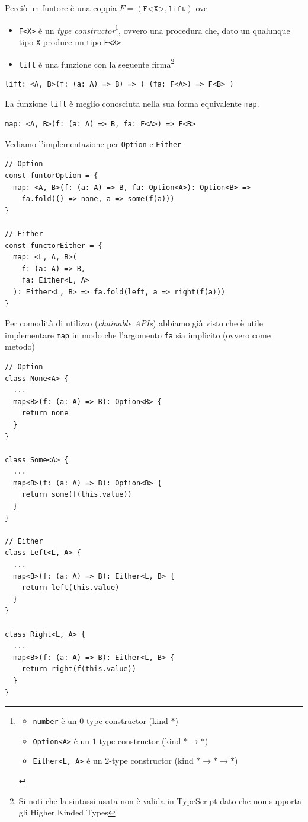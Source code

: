 \documentclass[12pt]{article}
\begin{document}
Perciò un funtore è una coppia $F = (\texttt{F<X>}, \texttt{lift})$ ove

\begin{itemize}
  \item \texttt{F<X>} è un \emph{type constructor}\footnote{
    \begin{itemize}
      \item \texttt{number} è un $0$-type constructor (kind $*$)
      \item \texttt{Option<A>} è un $1$-type constructor (kind $* \rightarrow *$)
      \item \texttt{Either<L, A>} è un $2$-type constructor (kind $* \rightarrow * \rightarrow *$)
    \end{itemize}
  }, ovvero una procedura che, dato un qualunque tipo \texttt{X} produce un tipo \texttt{F<X>}
  \item \texttt{lift} è una funzione con la seguente firma\footnote{Si noti che la sintassi usata non è valida in TypeScript dato che non supporta gli Higher Kinded Types}
\end{itemize}

\begin{verbatim}
lift: <A, B>(f: (a: A) => B) => ( (fa: F<A>) => F<B> )
\end{verbatim}

La funzione \texttt{lift} è meglio conosciuta nella sua forma equivalente \texttt{map}.

\begin{verbatim}
map: <A, B>(f: (a: A) => B, fa: F<A>) => F<B>
\end{verbatim}

Vediamo l'implementazione per \texttt{Option} e \texttt{Either}

\begin{verbatim}
// Option
const funtorOption = {
  map: <A, B>(f: (a: A) => B, fa: Option<A>): Option<B> =>
    fa.fold(() => none, a => some(f(a)))
}

// Either
const functorEither = {
  map: <L, A, B>(
    f: (a: A) => B,
    fa: Either<L, A>
  ): Either<L, B> => fa.fold(left, a => right(f(a)))
}
\end{verbatim}

Per comodità di utilizzo (\emph{chainable APIs}) abbiamo già visto che è utile implementare \texttt{map} in modo che
l'argomento \texttt{fa} sia implicito (ovvero come metodo)

\begin{verbatim}
// Option
class None<A> {
  ...
  map<B>(f: (a: A) => B): Option<B> {
    return none
  }
}

class Some<A> {
  ...
  map<B>(f: (a: A) => B): Option<B> {
    return some(f(this.value))
  }
}

// Either
class Left<L, A> {
  ...
  map<B>(f: (a: A) => B): Either<L, B> {
    return left(this.value)
  }
}

class Right<L, A> {
  ...
  map<B>(f: (a: A) => B): Either<L, B> {
    return right(f(this.value))
  }
}
\end{verbatim}
\end{document}
